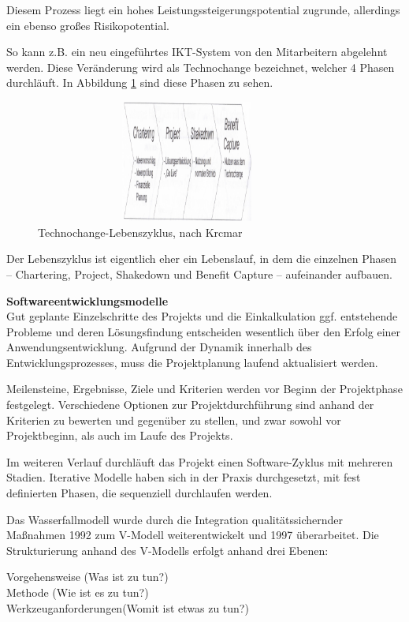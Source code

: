 Diesem Prozess liegt ein hohes Leistungssteigerungspotential zugrunde, allerdings ein ebenso großes Risikopotential. 

So kann z.B. ein neu eingeführtes IKT-System von den Mitarbeitern abgelehnt werden. Diese Veränderung wird als Technochange bezeichnet, welcher 4 Phasen durchläuft. In Abbildung \ref{fig_technochange_lebenszyklus} sind diese Phasen zu sehen.
\begin{figure}
	\centering
	\includegraphics[width=10cm, height=4cm]{kapitel/gruppe1_1/bilder/technochange_lebenszyklus}
	\caption{Technochange-Lebenszyklus, nach Krcmar}
	\label{fig_technochange_lebenszyklus}
\end{figure}
Der Lebenszyklus ist eigentlich eher ein Lebenslauf, in dem die einzelnen Phasen – Chartering, Project, Shakedown und Benefit Capture – aufeinander aufbauen.

\textbf{Softwareentwicklungsmodelle}\\
Gut geplante Einzelschritte des Projekts und die Einkalkulation ggf. entstehende Probleme und deren Lösungsfindung entscheiden wesentlich über den Erfolg einer Anwendungsentwicklung.
Aufgrund der Dynamik innerhalb des Entwicklungsprozesses, muss die Projektplanung laufend aktualisiert werden.

Meilensteine, Ergebnisse, Ziele und Kriterien werden vor Beginn der Projektphase festgelegt. Verschiedene Optionen zur Projektdurchführung sind anhand der Kriterien zu bewerten und gegenüber zu stellen, und zwar sowohl vor Projektbeginn, als auch im Laufe des Projekts.

Im weiteren Verlauf durchläuft das Projekt einen Software-Zyklus mit mehreren Stadien.  Iterative Modelle haben sich in der Praxis durchgesetzt, mit fest definierten Phasen, die sequenziell durchlaufen werden.

Das Wasserfallmodell wurde durch die Integration qualitätssichernder Maßnahmen 1992 zum V-Modell weiterentwickelt und 1997 überarbeitet. Die Strukturierung anhand des V-Modells erfolgt anhand drei Ebenen:

Vorgehensweise (Was ist zu tun?)\\
Methode (Wie ist es zu tun?)\\
Werkzeuganforderungen(Womit ist etwas zu tun?)

